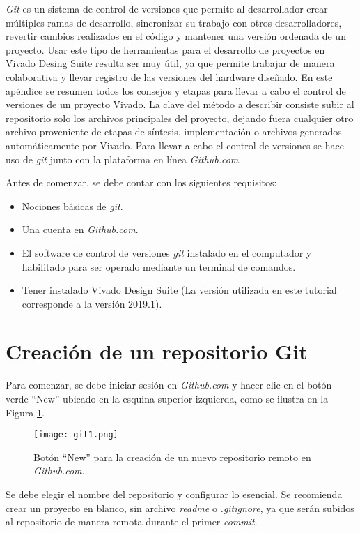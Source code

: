\textit{Git} es un sistema de control de versiones que permite al desarrollador crear múltiples ramas de desarrollo, sincronizar su trabajo con otros desarrolladores, revertir cambios realizados en el código y mantener una versión ordenada de un proyecto. Usar este tipo de herramientas para el desarrollo de proyectos en Vivado Desing Suite resulta ser muy útil, ya que permite trabajar de manera colaborativa y llevar registro de las versiones del hardware diseñado. En este apéndice se resumen todos los consejos y etapas para llevar a cabo el control de versiones de un proyecto Vivado. La clave del método a describir consiste subir al repositorio solo los archivos principales del proyecto, dejando fuera cualquier otro archivo proveniente de etapas de síntesis, implementación o archivos generados automáticamente por Vivado. Para llevar a cabo el control de versiones se hace uso de \textit{git} junto con la plataforma en línea \textit{Github.com}.

Antes de comenzar, se debe contar con los siguientes requisitos:
\begin{itemize}
	\item Nociones básicas de \textit{git}.
	\item Una cuenta en \textit{Github.com}.
	\item El software de control de versiones \textit{git} instalado en el computador y habilitado para ser operado mediante un terminal de comandos.
	\item Tener instalado Vivado Design Suite (La versión utilizada en este tutorial corresponde a la versión 2019.1).
\end{itemize}

\section{Creación de un repositorio Git}

	Para comenzar, se debe iniciar sesión en \textit{Github.com} y hacer clic en el botón verde  ``New'' ubicado en la esquina superior izquierda, como se ilustra en la Figura \ref{fig:git1}.
	
	\begin{figure}[ht]
		\centering
		\texttt{[image: git1.png]}
		\caption{Botón ``New'' para la creación de un nuevo repositorio remoto en \textit{Github.com}.}
		\label{fig:git1}
	\end{figure}
	
	Se debe elegir el nombre del repositorio y configurar lo esencial. Se recomienda crear un proyecto en blanco, sin archivo \textit{readme} o \textit{.gitignore}, ya que serán subidos al repositorio de manera remota durante el primer \textit{commit}.

